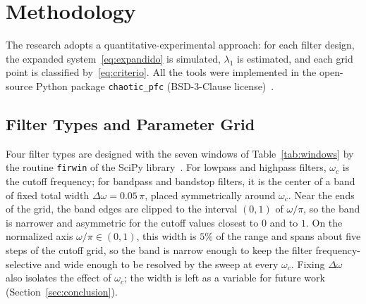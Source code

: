 \documentclass[journal]{IEEEtran}
\begin{document}
\section{Methodology}\label{sec:method}
The research adopts a quantitative-experimental approach: for each filter
design, the expanded system~\eqref{eq:expandido} is simulated, $\lambda_1$ is
estimated, and each grid point is classified by~\eqref{eq:criterio}. All the
tools were implemented in the open-source Python package
\texttt{chaotic\_pfc} (BSD-3-Clause license)~\cite{chaoticPFC2026}.

\subsection{Filter Types and Parameter Grid}\label{sub:grid}
Four filter types are designed with the seven windows of
Table~\ref{tab:windows} by the routine \texttt{firwin} of the SciPy
library~\cite{Virtanen2020}. For lowpass and highpass filters, $\omega_c$ is
the cutoff frequency; for bandpass and bandstop filters, it is the center of a
band of fixed total width $\Delta\omega=0.05\,\pi$, placed symmetrically around
$\omega_c$. Near the ends of the grid, the band edges are clipped to the interval
$(0,1)$ of $\omega/\pi$, so the band is narrower and asymmetric for the cutoff
values closest to $0$ and to $1$. On the normalized axis $\omega/\pi\in(0,1)$, this width is $5\%$
of the range and spans about five steps of the cutoff grid, so the band is
narrow enough to keep the filter frequency-selective and wide enough to be
resolved by the sweep at every $\omega_c$. Fixing $\Delta\omega$ also isolates
the effect of $\omega_c$; the width is left as a variable for future work
(Section~\ref{sec:conclusion}).
\end{document}
